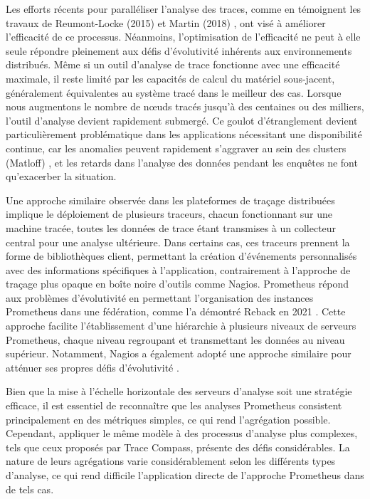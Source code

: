 Les efforts récents pour paralléliser l'analyse des traces, comme en témoignent les travaux de Reumont-Locke (2015) \cite{reumont2015methodes} et Martin (2018) \cite{Martin2018}, ont visé à améliorer l'efficacité de ce processus. Néanmoins, l'optimisation de l'efficacité ne peut à elle seule répondre pleinement aux défis d'évolutivité inhérents aux environnements distribués. Même si un outil d'analyse de trace fonctionne avec une efficacité maximale, il reste limité par les capacités de calcul du matériel sous-jacent, généralement équivalentes au système tracé dans le meilleur des cas. Lorsque nous augmentons le nombre de nœuds tracés jusqu'à des centaines ou des milliers, l'outil d'analyse devient rapidement submergé. Ce goulot d'étranglement devient particulièrement problématique dans les applications nécessitant une disponibilité continue, car les anomalies peuvent rapidement s'aggraver au sein des clusters (Matloff) \cite{matloff2011programming}, et les retards dans l'analyse des données pendant les enquêtes ne font qu'exacerber la situation.

Une approche similaire observée dans les plateformes de traçage distribuées implique le déploiement de plusieurs traceurs, chacun fonctionnant sur une machine tracée, toutes les données de trace étant transmises à un collecteur central pour une analyse ultérieure. Dans certains cas, ces traceurs prennent la forme de bibliothèques client, permettant la création d'événements personnalisés avec des informations spécifiques à l'application, contrairement à l'approche de traçage plus opaque en boîte noire d'outils comme Nagios. Prometheus répond aux problèmes d'évolutivité en permettant l'organisation des instances Prometheus dans une fédération, comme l'a démontré Reback en 2021 \cite{Logz.io_prometheus_2023}. Cette approche facilite l'établissement d'une hiérarchie à plusieurs niveaux de serveurs Prometheus, chaque niveau regroupant et transmettant les données au niveau supérieur. Notamment, Nagios a également adopté une approche similaire pour atténuer ses propres défis d'évolutivité \cite{Nagios2019}.

Bien que la mise à l'échelle horizontale des serveurs d'analyse soit une stratégie efficace, il est essentiel de reconnaître que les analyses Prometheus consistent principalement en des métriques simples, ce qui rend l'agrégation possible. Cependant, appliquer le même modèle à des processus d'analyse plus complexes, tels que ceux proposés par Trace Compass, présente des défis considérables. La nature de leurs agrégations varie considérablement selon les différents types d'analyse, ce qui rend difficile l'application directe de l'approche Prometheus dans de tels cas.

